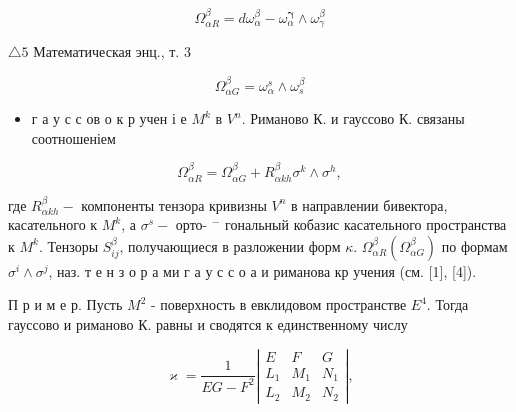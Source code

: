 \documentclass[10pt]{article}
\begin{document}
\[

\Omega_{\alpha R}^{\beta}=d \omega_{\alpha}^{\beta}-\omega_{\alpha}^{\boldsymbol{\gamma}} \wedge \omega_{\gamma}^{\beta}

\]



$\triangle 5$ Математическая энц., т. 3



\[

\Omega_{\alpha G}^{\beta}=\omega_{\alpha}^{s} \wedge \omega_{s}^{\beta}

\]



\begin{itemize}

  \item г а у с с ов о к р учен і е $M^{k}$ в $V^{n}$. Риманово К. и гауссово К. связаны соотношеніем

\end{itemize}



\[

\Omega_{\alpha R}^{\beta}=\Omega_{\alpha G}^{\beta}+R_{\alpha k h}^{\beta} \sigma^{k} \wedge \sigma^{h},

\]



где $R_{\alpha k h}^{\beta}-$ компоненты тензора кривизны $V^{n}$ в направлении бивектора, касательного к $M^{k}$, а $\sigma^{s}-$ орто- $^{-}$ гональный кобазис касательного пространства к $M^{k}$. Тензоры $S_{i j}^{\beta}$, получающиеся в разложении форм $\mathfrak{\kappa}$. $\Omega_{\alpha R}^{\beta}\left(\Omega_{\alpha G}^{\beta}\right)$ по формам $\sigma^{i} \wedge \sigma^{j}$, наз. т е н з о р а ми г а у с с о а и риманова кр учения (см. [1], [4]).



П р и м е р. Пусть $M^{2}$ - поверхность в евклидовом пространстве $E^{4}$. Тогда гауссово и риманово К. равны и сводятся к единственному числу



\[

\varkappa=\frac{1}{E G-F^{2}}\left|\begin{array}{lll}

E & F & G \\

L_{1} & M_{1} & N_{1} \\

L_{2} & M_{2} & N_{2}

\end{array}\right|,

\]
\end{document}
